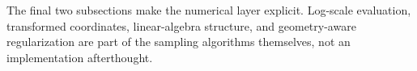 The final two subsections make the numerical layer explicit.
Log-scale evaluation, transformed coordinates, linear-algebra structure, and geometry-aware regularization are part of the sampling algorithms themselves, not an implementation afterthought.



